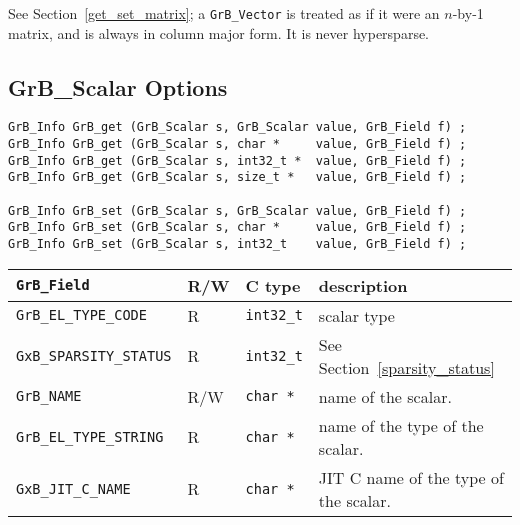 See Section~\ref{get_set_matrix}; a \verb'GrB_Vector' is treated as if it were
an $n$-by-1 matrix, and is always in column major form.  It is never
hypersparse.

\subsection{{\sf GrB\_Scalar} Options}
\label{get_set_scalar}

\begin{mdframed}[userdefinedwidth=6in]
{\footnotesize
\begin{verbatim}
GrB_Info GrB_get (GrB_Scalar s, GrB_Scalar value, GrB_Field f) ;
GrB_Info GrB_get (GrB_Scalar s, char *     value, GrB_Field f) ;
GrB_Info GrB_get (GrB_Scalar s, int32_t *  value, GrB_Field f) ;
GrB_Info GrB_get (GrB_Scalar s, size_t *   value, GrB_Field f) ;

GrB_Info GrB_set (GrB_Scalar s, GrB_Scalar value, GrB_Field f) ;
GrB_Info GrB_set (GrB_Scalar s, char *     value, GrB_Field f) ;
GrB_Info GrB_set (GrB_Scalar s, int32_t    value, GrB_Field f) ;
\end{verbatim}
}\end{mdframed}

\noindent
{\small
\begin{tabular}{|l|l|l|p{3in}|}
\hline
\verb'GrB_Field'                    & R/W  & C type        & description \\
\hline

\verb'GrB_EL_TYPE_CODE'             & R    & \verb'int32_t'& scalar type \\
\verb'GxB_SPARSITY_STATUS'          & R    & \verb'int32_t'& See Section~\ref{sparsity_status} \\
\hline
\verb'GrB_NAME'                     & R/W  & \verb'char *' & name of the scalar. \\
\verb'GrB_EL_TYPE_STRING'           & R    & \verb'char *' & name of the type of the scalar. \\
\verb'GxB_JIT_C_NAME'               & R    & \verb'char *' & JIT C name of the type of the scalar. \\
\hline
\end{tabular}
}
\vspace{0.1in}

